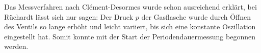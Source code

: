 Das Messverfahren nach Clément-Desormes wurde schon ausreichend erklärt, bei Rüchardt lässt sich nur sagen: Der Druck \(p\) der Gasflasche wurde durch Öffnen des Ventils so lange erhöht und leicht variiert, bis sich eine konstante Oszillation eingestellt hat. Somit konnte mit der Start der Periodendauermessung begonnen werden. 


